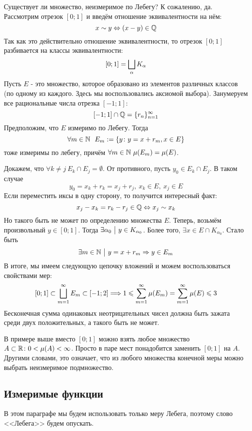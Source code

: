\begin{example}
	Существует ли множество, неизмеримое по Лебегу? К сожалению, да. Рассмотрим отрезок $[0; 1]$ и введём отношение эквивалентности на нём:
	\[
		x \sim y \Leftrightarrow (x - y) \in \mathbb{Q}
	\]
	Так как это действительно отношение эквивалентности, то отрезок $[0; 1]$ разбивается на классы эквивалентности:
	\[
		[0; 1] = \bigsqcup_{\alpha} K_\alpha
	\]
	Пусть $E$ - это множество, которое образовано из элементов различных классов (по одному из каждого. Здесь мы воспользовались аксиомой выбора). Занумеруем все рациональные числа отрезка $[-1; 1]$:
	\[
		[-1; 1] \cap \mathbb{Q} = \{r_n\}_{n = 1}^\infty
	\]
	Предположим, что $E$ измеримо по Лебегу. Тогда
	\[
		\forall m \in \N\ \ E_m := \{y \colon y = x + r_m, x \in E\}
	\]
	тоже измеримы по лебегу, причём $\forall m \in \mathbb{N}\ \mu(E_m) = \mu(E)$.
	
	Докажем, что $\forall k \neq j\ E_k \cap E_j = \emptyset$. От противного, пусть $y_0 \in E_k \cap E_j$. В таком случае
	\[
		y_0 = x_k + r_k = x_j + r_j,\ x_k \in E,\ x_j \in E
	\]
	Если переместить иксы в одну сторону, то получится интересный факт:
	\[
		x_j - x_k = r_k - r_j \in \mathbb{Q} \Leftrightarrow x_j \sim x_k
	\]
	Но такого быть не может по определению множества $E$. Теперь, возьмём произвольный $y \in [0; 1]$. Тогда $\exists \alpha_0 \ \big|\  y \in K_{\alpha_0}$. Более того, $\exists x \in E \cap K_{\alpha_0}$. Стало быть
	\[
		\exists m \in \mathbb{N} \ \big|\  y = x + r_m \Rightarrow y \in E_m
	\]
	В итоге, мы имеем следующую цепочку вложений и можем воспользоваться свойствами мер:
	\[
		[0; 1] \subset \bigsqcup_{m = 1}^\infty E_m \subset [-1; 2] \Longrightarrow 1 \leqslant \sum_{m = 1}^\infty \mu(E_m) = \sum_{m = 1}^\infty \mu(E) \leqslant 3
	\]
	Бесконечная сумма одинаковых неотрицательных чисел должна быть зажата среди двух положительных, а такого быть не может.
\end{example}

\begin{note}
	В примере выше вместо $[0; 1]$ можно взять любое множество $A \subset \mathbb{R} \colon 0 < \mu(A) < \infty$. Просто в паре мест понадобится заменить $[0; 1]$ на $A$. Другими словами, это означает, что из любого множества конечной меры можно выбрать неизмеримое подмножество.
\end{note}

\subsection{Измеримые функции}

\begin{note}
	В этом параграфе мы будем использовать только меру Лебега, поэтому слово <<Лебега>> будем опускать.
\end{note}

